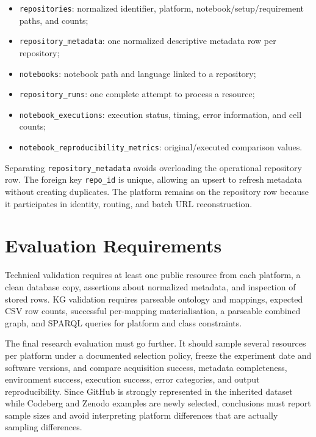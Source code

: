 \begin{itemize}
  \item \texttt{repositories}: normalized identifier, platform, notebook/setup/requirement paths, and counts;
  \item \texttt{repository\_metadata}: one normalized descriptive metadata row per repository;
  \item \texttt{notebooks}: notebook path and language linked to a repository;
  \item \texttt{repository\_runs}: one complete attempt to process a resource;
  \item \texttt{notebook\_executions}: execution status, timing, error information, and cell counts;
  \item \texttt{notebook\_reproducibility\_metrics}: original/executed comparison values.
\end{itemize}

Separating \texttt{repository\_metadata} avoids overloading the operational repository row. The foreign key \texttt{repo\_id} is unique, allowing an upsert to refresh metadata without creating duplicates. The platform remains on the repository row because it participates in identity, routing, and batch URL reconstruction.

\section{Evaluation Requirements}

Technical validation requires at least one public resource from each platform, a clean database copy, assertions about normalized metadata, and inspection of stored rows. KG validation requires parseable ontology and mappings, expected CSV row counts, successful per-mapping materialisation, a parseable combined graph, and SPARQL queries for platform and class constraints.

The final research evaluation must go further. It should sample several resources per platform under a documented selection policy, freeze the experiment date and software versions, and compare acquisition success, metadata completeness, environment success, execution success, error categories, and output reproducibility. Since GitHub is strongly represented in the inherited dataset while Codeberg and Zenodo examples are newly selected, conclusions must report sample sizes and avoid interpreting platform differences that are actually sampling differences.
